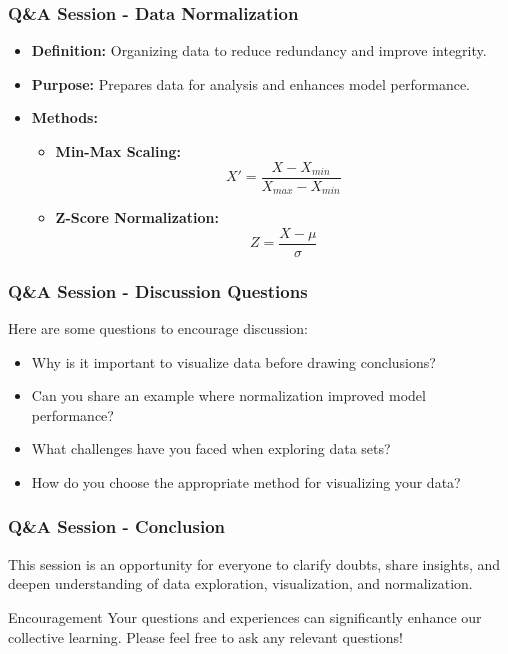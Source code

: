 \documentclass[aspectratio=169]{beamer}
\begin{document}
\begin{frame}[fragile]
  \frametitle{Q\&A Session - Data Normalization}
  \begin{itemize}
    \item \textbf{Definition:} Organizing data to reduce redundancy and improve integrity.
    \item \textbf{Purpose:} Prepares data for analysis and enhances model performance.
    \item \textbf{Methods:}
      \begin{itemize}
        \item \textbf{Min-Max Scaling:}
          \begin{equation}
          X' = \frac{X - X_{min}}{X_{max} - X_{min}}
          \end{equation}
        \item \textbf{Z-Score Normalization:}
          \begin{equation}
          Z = \frac{X - \mu}{\sigma}
          \end{equation}
      \end{itemize}
  \end{itemize}
\end{frame}

\begin{frame}[fragile]
  \frametitle{Q\&A Session - Discussion Questions}
  Here are some questions to encourage discussion:
  \begin{itemize}
    \item Why is it important to visualize data before drawing conclusions?
    \item Can you share an example where normalization improved model performance?
    \item What challenges have you faced when exploring data sets?
    \item How do you choose the appropriate method for visualizing your data?
  \end{itemize}
\end{frame}

\begin{frame}[fragile]
  \frametitle{Q\&A Session - Conclusion}
  This session is an opportunity for everyone to clarify doubts, share insights, and deepen understanding of data exploration, visualization, and normalization. 
  \begin{block}{Encouragement}
    Your questions and experiences can significantly enhance our collective learning. Please feel free to ask any relevant questions!
  \end{block}
\end{frame}
\end{document}
